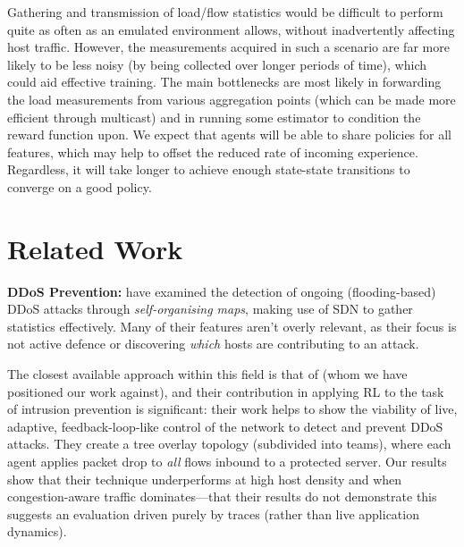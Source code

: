 \documentclass[10pt, times, comsoc]{IEEEtran}
\newcommand{\fakepara}[1]{\noindent\textbf{#1:}}
\begin{document}
Gathering and transmission of load/flow statistics would be difficult to perform quite as often as an emulated environment allows, without inadvertently affecting host traffic.
However, the measurements acquired in such a scenario are far more likely to be less noisy (by being collected over longer periods of time), which could aid effective training.
The main bottlenecks are most likely in forwarding the load measurements from various aggregation points (which can be made more efficient through multicast) and in running some estimator to condition the reward function upon.
We expect that agents will be able to share policies for all features, which may help to offset the reduced rate of incoming experience.
Regardless, it will take longer to achieve enough state-state transitions to converge on a good policy.

\section{Related Work}\label{sec:related-work}


\fakepara{DDoS Prevention}
\Textcite{DBLP:conf/lcn/BragaMP10} have examined the detection of ongoing (flooding-based) DDoS attacks through \emph{self-organising maps}, making use of SDN to gather statistics effectively.
Many of their features aren't overly relevant, as their focus is not active defence or discovering \emph{which} hosts are contributing to an attack.

The closest available approach within this field is that of \textcite{DBLP:journals/eaai/MalialisK15} (whom we have positioned our work against), and their contribution in applying RL to the task of intrusion prevention is significant: their work helps to show the viability of live, adaptive, feedback-loop-like control of the network to detect and prevent DDoS attacks.
They create a tree overlay topology (subdivided into teams), where each agent applies packet drop to \emph{all} flows inbound to a protected server.
Our results show that their technique underperforms at high host density and when congestion-aware traffic dominates---that their results do not demonstrate this suggests an evaluation driven purely by traces (rather than live application dynamics).
\end{document}
